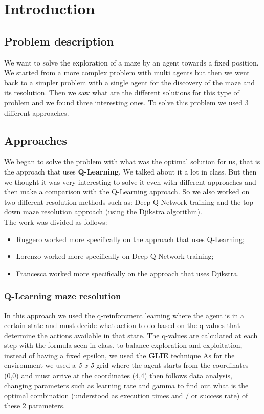 \chapter{Introduction}


\section{Problem description}
We want to solve the exploration of a maze by an agent towards a fixed position.
We started from a more complex problem with multi agents but then we went back to a simpler problem with a single agent for the discovery of the maze and its resolution. Then we saw what are the different solutions for this type of problem and we found three interesting ones.
To solve this problem we used 3 different approaches.


\section{Approaches}

We began to solve the problem with what was the optimal solution for us, that is the approach that uses \textbf{Q-Learning}. We talked about it a lot in class.
 But then we thought it was very interesting to solve it even with different approaches and then make a comparison with the Q-Learning approach. So we also worked on two different resolution methods such as: Deep Q Network training and the top-down maze resolution approach (using the Djikstra algorithm).
\\
The work was divided as follows:
\begin{itemize}
\item Ruggero worked more specifically on the approach that uses Q-Learning;
\item Lorenzo worked more specifically on Deep Q Network training;
\item Francesca worked more specifically on the approach that uses Djikstra.

\end{itemize}




\subsection{Q-Learning maze resolution }
In this approach we used the q-reinforcment learning where the agent is in a certain state and must decide what action to do based on the q-values that determine the actions available in that state. 
The q-values are calculated at each step with the formula seen in class. 
to balance exploration and exploitation, instead of having a fixed epsilon, we used the \textbf{GLIE} technique
As for the environment we used a \textit{5 x 5} grid where the agent starts from the coordinates (0,0) and must arrive at the coordinates (4,4)
then follows data analysis, changing parameters such as learning rate and gamma to find out what is the optimal combination (understood as execution times and / or success rate) of these 2 parameters.

